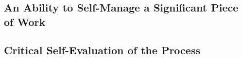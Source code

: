 \documentclass[12pt]{article}
\begin{document}
\subsection{An Ability to Self-Manage a Significant Piece of Work}

\subsection{Critical Self-Evaluation of the Process}


\printbibliography
\end{document}
